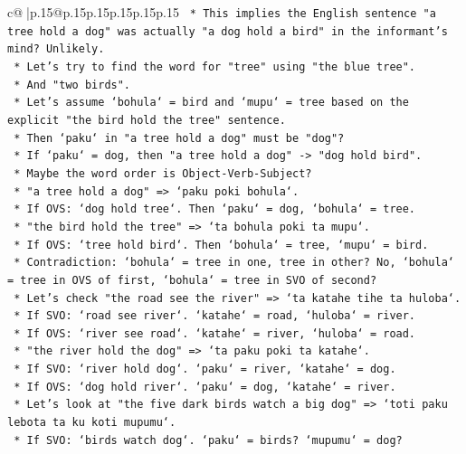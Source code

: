 \documentclass{article}
\begin{document}
{\begin{supertabular}{c@{$\;$}|p{.15\linewidth}@{}p{.15\linewidth}p{.15\linewidth}p{.15\linewidth}p{.15\linewidth}p{.15\linewidth}}
{{{\texttt{                *   This implies the English sentence "a tree hold a dog" was actually "a dog hold a bird" in the informant's mind? Unlikely.} \\
\texttt{            *   Let's try to find the word for "tree" using "the blue tree".} \\
\texttt{            *   And "two birds".} \\
\texttt{            *   Let's assume `bohula` = bird and `mupu` = tree based on the explicit "the bird hold the tree" sentence.} \\
\texttt{            *   Then `paku` in "a tree hold a dog" must be "dog"?} \\
\texttt{            *   If `paku` = dog, then "a tree hold a dog" {-}> "dog hold bird".} \\
\texttt{            *   Maybe the word order is Object{-}Verb{-}Subject?} \\
\texttt{            *   "a tree hold a dog" => `paku poki bohula`.} \\
\texttt{            *   If OVS: `dog hold tree`. Then `paku` = dog, `bohula` = tree.} \\
\texttt{            *   "the bird hold the tree" => `ta bohula poki ta mupu`.} \\
\texttt{            *   If OVS: `tree hold bird`. Then `bohula` = tree, `mupu` = bird.} \\
\texttt{            *   Contradiction: `bohula` = tree in one, tree in other? No, `bohula` = tree in OVS of first, `bohula` = tree in SVO of second?} \\
\texttt{            *   Let's check "the road see the river" => `ta katahe tihe ta huloba`.} \\
\texttt{                *   If SVO: `road see river`. `katahe` = road, `huloba` = river.} \\
\texttt{                *   If OVS: `river see road`. `katahe` = river, `huloba` = road.} \\
\texttt{            *   "the river hold the dog" => `ta paku poki ta katahe`.} \\
\texttt{                *   If SVO: `river hold dog`. `paku` = river, `katahe` = dog.} \\
\texttt{                *   If OVS: `dog hold river`. `paku` = dog, `katahe` = river.} \\
\texttt{            *   Let's look at "the five dark birds watch a big dog" => `toti paku lebota ta ku koti mupumu`.} \\
\texttt{                *   If SVO: `birds watch dog`. `paku` = birds? `mupumu` = dog?} \\
}}}
\end{supertabular}}
\end{document}
